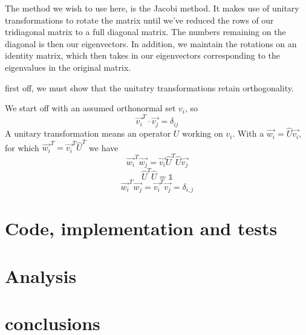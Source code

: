 \documentclass[10pt, twocolumn]{article}
\begin{document}
The method we wish to use here, is the Jacobi method. It makes use of unitary transformations to 
rotate the matrix until we've reduced the rows of our tridiagonal matrix to a full diagonal matrix. 
The numbers remaining on the diagonal is then our eigenvectors. In addition, we maintain the 
rotations on an identity matrix, which then takes in our eigenvectors corresponding to the 
eigenvalues in the original matrix. 

first off, we must show that the unitatry transformations retain orthogonality. 

We start off with an assumed orthonormal set $v_i$, so
\[
\vec{v_i}^T \cdot \vec{v_j} = \delta_{ij}
\]
A unitary transformation means an operator $U$ working on $v_i$.
With a $\vec{w_{i}} = \hat{U}\vec{v_{i}}$, for which 
$\vec{w_{i}}^T = \vec{v_{i}}^T\hat{U}^T$ we have 
\[
    \vec{w_{i}}^T\vec{w_{j}} = \vec{v_i} \hat{U}^T \hat{U} \vec{v_j} 
\]
\[
    \hat{U}^T \hat{U} = \mathds{1} 
\]
\[
    \vec{w_i}^T\vec{w_j} = \vec{v_i}^T\vec{v_j} = \delta_{i,j}
\]
    
\section{Code, implementation and tests}

\section{Analysis}


\section{conclusions}




\end{document}
